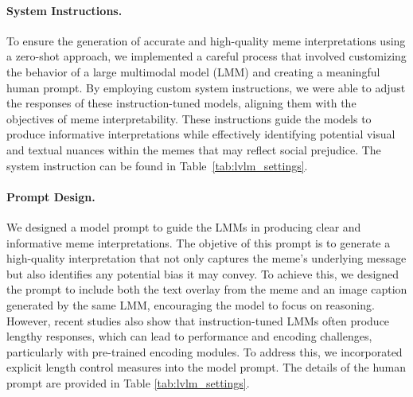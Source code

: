 \paragraph{System Instructions.} 
To ensure the generation of accurate and high-quality meme interpretations using a zero-shot approach, we implemented a careful process that involved customizing the behavior of a large multimodal model (LMM) and creating a meaningful human prompt. By employing custom system instructions, we were able to adjust the responses of these instruction-tuned models, aligning them with the objectives of meme interpretability. These instructions guide the models to produce informative interpretations while effectively identifying potential visual and textual nuances within the memes that may reflect social prejudice. The system instruction can be found in Table~\ref{tab:lvlm_settings}.

\paragraph{Prompt Design.} 
We designed a model prompt to guide the LMMs in producing clear and informative meme interpretations. The objetive of this prompt is to generate a high-quality interpretation that not only captures the meme's underlying message but also identifies any potential bias it may convey. To achieve this, we designed the prompt to include both the text overlay from the meme and an image caption generated by the same LMM, encouraging the model to focus on reasoning. However, recent studies also show that instruction-tuned LMMs often produce lengthy responses, which can lead to performance and encoding challenges, particularly with pre-trained encoding modules. To address this, we incorporated explicit length control measures into the model prompt. The details of the human prompt are provided in Table \ref{tab:lvlm_settings}.

